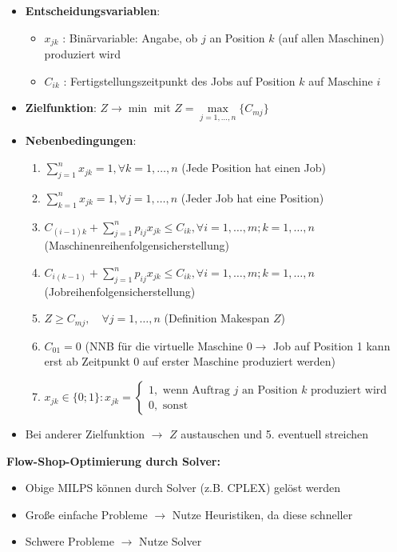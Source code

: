 \begin{itemize}
	\item \textbf{Entscheidungsvariablen}:
	\begin{itemize}
		\item $x_{jk}$ : Binärvariable: Angabe, ob $j$ an Position $k$ (auf allen Maschinen) produziert wird
		\item $C_{ik}$ : Fertigstellungszeitpunkt des Jobs auf Position $k$ auf Maschine $i$
	\end{itemize}
	\item \textbf{Zielfunktion}: $Z \rightarrow \min$ mit $Z=\max\limits_{j=1,\ldots,n}\{C_{mj}\}$
	\item \textbf{Nebenbedingungen}:
	\begin{enumerate}
		\item $\sum\limits_{j=1}^{n} x_{j k}=1, \forall k=1, \ldots, n$ (Jede Position hat einen Job)
		\item $\sum\limits_{k=1}^{n} x_{j k}=1, \forall j=1, \ldots, n$ (Jeder Job hat eine Position)
		\item $C_{(i-1) k}+\sum_{j=1}^{n} p_{i j} x_{j k} \leq C_{i k}, \forall i=1, \ldots, m ; k=1, \ldots, n$ (Maschinenreihenfolgensicherstellung)
		\item $C_{i(k-1)}+\sum_{j=1}^{n} p_{i j} x_{j k} \leq C_{i k}, \forall i=1, \ldots, m ; k=1, \ldots, n$ (Jobreihenfolgensicherstellung)
		\item $Z \geq C_{m j}, \quad \forall j=1, \ldots, n$ (Definition Makespan $Z$)
		\item $C_{01}=0$ (NNB für die virtuelle Maschine $0 \rightarrow$ Job auf Position 1 kann erst ab Zeitpunkt 0 auf erster Maschine produziert werden)
		\item $x_{j k} \in\{0 ; 1\}: x_{j k}=\left\{\begin{array}{l}1, \text { wenn Auftrag } j \text { an Position } k \text { produziert wird } \\ 0, \text { sonst }\end{array}\right.$
	\end{enumerate}
	\item Bei anderer Zielfunktion $\rightarrow$ $Z$ austauschen und 5. eventuell streichen
\end{itemize}
\bigskip
\textbf{Flow-Shop-Optimierung durch Solver:}
\begin{itemize}
	\item Obige MILPS können durch Solver (z.B. CPLEX) gelöst werden
	\item Große einfache Probleme $\rightarrow$ Nutze Heuristiken, da diese schneller
	\item Schwere Probleme $\rightarrow$ Nutze Solver
\end{itemize}